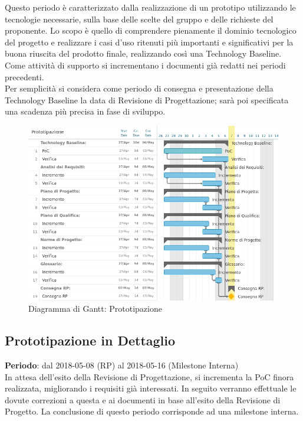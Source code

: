 Questo periodo è caratterizzato dalla realizzazione di un prototipo utilizzando le tecnologie necessarie, sulla base delle scelte del gruppo \Gruppo e delle richieste del proponente.
Lo scopo è quello di comprendere pienamente il dominio tecnologico del progetto e realizzare i casi d'uso ritenuti più importanti e significativi per la buona riuscita del prodotto finale, realizzando così una Technology Baseline. \\ 
Come attività di supporto si incrementano i documenti già redatti nei periodi precedenti.\\
Per semplicità si considera come periodo di consegna e presentazione della Technology Baseline la data di Revisione di Progettazione; sarà poi specificata una scadenza più precisa in fase di sviluppo. \\

\begin{figure}
	\centerline{\includegraphics[scale=0.5]{img/DiagrammiGantt/Prototipazione.jpg}}
	\caption{Diagramma di Gantt: Prototipazione}
\end{figure}
\clearpage

\subsection{Prototipazione in Dettaglio}
\textbf{Periodo}: dal 2018-05-08 (RP) al 2018-05-16 (Milestone Interna)\\

In attesa dell'esito della Revisione di Progettazione, si incrementa la PoC finora realizzata, migliorando i requisiti già interessati. In seguito verranno effettuale le dovute correzioni a questa e ai documenti in base all'esito della Revisione di Progetto. La conclusione di questo periodo corrisponde ad una milestone interna.\\

